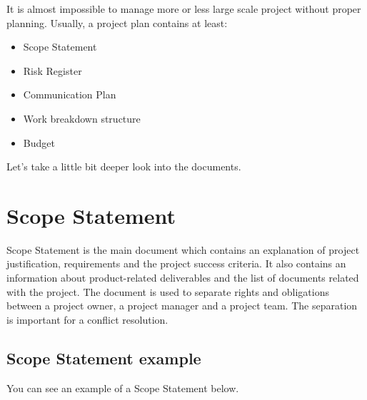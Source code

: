 \documentclass[english]{article}
\begin{document}
It is almost impossible to manage more or less large scale project without proper planning. Usually, a project plan contains at least:

\begin{itemize}
\item Scope Statement
\item Risk Register
\item Communication Plan
\item Work breakdown structure
\item Budget
\end{itemize}

Let's take a little bit deeper look into the documents. \cite{man}

\section{Scope Statement}
Scope Statement is the main document which contains an explanation of project justification, requirements and the project success criteria. It also contains an information about product-related deliverables and the list of documents related with the project. The document is used to separate rights and obligations between a project owner, a project manager and a project team. The separation is important for a conflict resolution.\cite{man}\\

\subsection{Scope Statement example}
You can see an example of a Scope Statement below.
\end{document}
